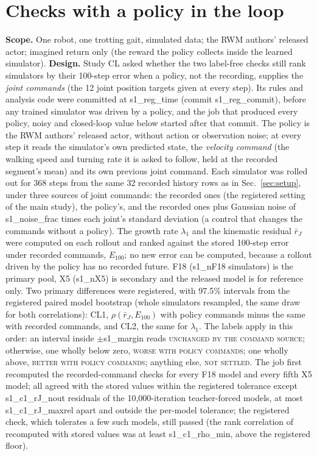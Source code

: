\section{Checks with a policy in the loop}\label{app:A8}
\textbf{Scope.} One robot, one trotting gait, simulated data; the RWM authors' released actor; imagined return only (the reward the policy collects inside the learned simulator).
\textbf{Design.} Study CL asked whether the two label-free checks still rank simulators by their 100-step error when
a policy, not the recording, supplies the \emph{joint commands} (the 12 joint position targets given at every step).
Its rules and analysis code were committed at {{s1_reg_time}} (commit {{s1_reg_commit}}), before any trained
simulator was driven by a policy, and the job that produced every policy, noisy and closed-loop value below started after that commit. The policy
is the RWM authors' released actor, without action or observation noise; at every step it reads the simulator's own
predicted state, the \emph{velocity command} (the walking speed and turning rate it is asked to follow, held at the
recorded segment's mean) and its own previous joint command. Each simulator was rolled out for 368 steps from the same
32 recorded history rows as in Sec.~\ref{sec:setup}, under three sources of joint commands: the recorded ones (the
registered setting of the main study), the policy's, and the recorded ones plus Gaussian noise of {{s1_noise_frac}}
times each joint's standard deviation (a control that changes the commands without a policy). The growth rate $\lambda_1$ and the
kinematic residual $\bar r_J$ were computed on each rollout and ranked against the stored 100-step error under
recorded commands, $E_{100}$; no new error can be computed, because a rollout driven by the policy has no recorded
future. F18 ({{s1_nF18}} simulators) is the primary pool, X5 ({{s1_nX5}}) is secondary and the released model is
for reference only. Two primary differences were registered, with 97.5\% intervals from the registered paired model
bootstrap (whole simulators resampled, the same draw for both correlations): CL1, $\rho(\bar r_J,E_{100})$ with policy commands minus the same with recorded commands, and CL2, the
same for $\lambda_1$. The labels apply in this order: an interval inside $\pm${{s1_margin}} reads \textsc{unchanged by the command source}; otherwise, one
wholly below zero, \textsc{worse with policy commands}; one wholly above, \textsc{better with policy commands};
anything else, \textsc{not settled}. The job first recomputed the recorded-command checks for every F18 model and
every fifth X5 model; all agreed with the stored values within the registered tolerance except {{s1_c1_rJ_nout}}
residuals of the 10{,}000-iteration teacher-forced models, at most {{s1_c1_rJ_maxrel}} apart and outside the per-model tolerance; the registered
check, which tolerates a few such models, still passed (the rank correlation of recomputed with stored values was at least {{s1_c1_rho_min}}, above the registered floor).

